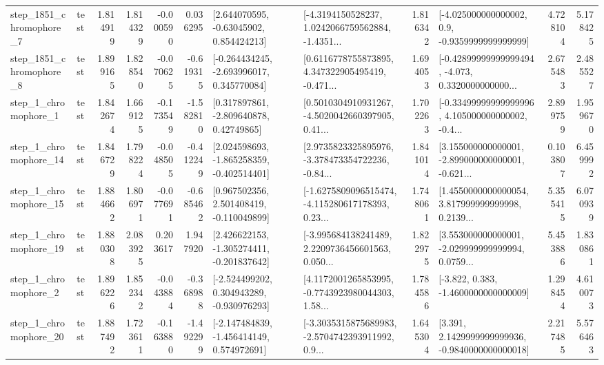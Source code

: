 \begin{tabular}{llrrrrllrlrr}
  step\_1851\_chromophore\_7 &      test &      1.814919 &    1.814329 &     -0.000590 &  0.036295 &     [2.644070595, -0.63045902, 0.854424213] &  [-4.3194150528237, 1.0242066759562884, -1.4351... &       1.816342 &     [-4.025000000000002, 0.9, -0.9359999999999999] &            4.728104 &          5.178425 \\
  step\_1851\_chromophore\_8 &      test &      1.899165 &    1.828540 &     -0.070625 & -0.619315 &   [-0.264434245, -2.693996017, 0.345770084] &  [0.6116778755873895, 4.347322905495419, -0.471... &       1.694053 &  [-0.42899999999999494, -4.073, 0.3320000000000... &            2.675483 &          2.485527 \\
     step\_1\_chromophore\_1 &      test &      1.842674 &    1.669125 &     -0.173549 & -1.582810 &     [0.317897861, -2.809640878, 0.42749865] &  [0.5010304910931267, -4.5020042660397905, 0.41... &       1.702263 &  [-0.33499999999999996, 4.105000000000002, -0.4... &            2.899759 &          1.959670 \\
    step\_1\_chromophore\_14 &      test &      1.846729 &    1.798224 &     -0.048505 & -0.412249 &   [2.024598693, -1.865258359, -0.402514401] &  [2.9735823325895976, -3.378473354722236, -0.84... &       1.841014 &  [3.155000000000001, -2.899000000000001, -0.621... &            0.103807 &          6.459992 \\
    step\_1\_chromophore\_15 &      test &      1.884662 &    1.806971 &     -0.077691 & -0.685462 &    [0.967502356, 2.501408419, -0.110049899] &  [-1.6275809096515474, -4.115280617178393, 0.23... &       1.748061 &  [1.4550000000000054, 3.817999999999998, 0.2139... &            5.355415 &          6.070939 \\
    step\_1\_chromophore\_19 &      test &      1.880308 &    2.083925 &      0.203617 &  1.947920 &   [2.426622153, -1.305274411, -0.201837642] &  [-3.995684138241489, 2.2209736456601563, 0.050... &       1.822975 &  [3.553000000000001, -2.029999999999994, 0.0759... &            5.453886 &          1.830861 \\
     step\_1\_chromophore\_2 &      test &      1.896226 &    1.852342 &     -0.043884 & -0.368988 &   [-2.524499202, 0.304943289, -0.930976293] &  [4.1172001265853995, -0.7743923980044303, 1.58... &       1.784586 &               [-3.822, 0.383, -1.4600000000000009] &            1.298454 &          4.610073 \\
    step\_1\_chromophore\_20 &      test &      1.887492 &    1.723611 &     -0.163880 & -1.492299 &   [-2.147484839, -1.456414149, 0.574972691] &  [-3.3035315875689983, -2.5704742393911992, 0.9... &       1.645304 &   [3.391, 2.1429999999999936, -0.9840000000000018] &            2.217485 &          5.576463 \\

\end{tabular}
